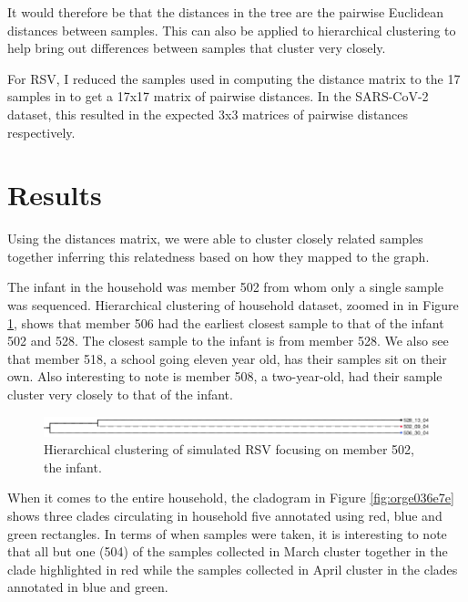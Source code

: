 \documentclass[10pt, a4paper]{article}
\begin{document}
It would therefore be that the distances in the tree are the pairwise Euclidean
distances between samples. This can also be applied to hierarchical clustering
to help bring out differences between samples that cluster very closely.

For RSV, I reduced the samples used in computing the distance matrix to the 17
samples in \cite{githinjiAssessingUtilityMinority2018} to get a 17x17 matrix of
pairwise distances.
In the SARS-CoV-2 dataset, this resulted in the expected 3x3 matrices of
pairwise distances respectively.

\clearpage

\clearpage
\section{Results}
\label{sec:org36f96dc}
Using the distances matrix, we were able to cluster closely related samples
together inferring this relatedness based on how they mapped to the graph. 

The infant in the household was member 502 from whom only a single sample was
sequenced. Hierarchical clustering of household dataset, zoomed in in
Figure \ref{fig:org06b024e}, shows that member 506 had the earliest closest sample
to that of the infant 502 and 528.
The closest sample to the infant is from member 528.
We also see that member 518, a school going eleven year old, has their samples
sit on their own.
Also interesting to note is member 508, a two-year-old, had their sample cluster
very closely to that of the infant.

\begin{figure}[h]
\centering
\includegraphics[width=1.0\textwidth]{../Figures/hh20-clado-infant.png}
\caption[A section of the cladogram of RSV focused on the infant]{\label{fig:org06b024e}Hierarchical clustering of simulated RSV focusing on member 502, the infant.}
\end{figure}


When it comes to the entire household, the cladogram in Figure \ref{fig:orge036e7e} shows three
clades circulating in household five annotated using red, blue and green rectangles.
In terms of when samples were taken, it is interesting to note that all but one
(504) of the samples collected in March cluster together in the clade
highlighted in red while the samples collected in April cluster in the clades
annotated in blue and green.
\end{document}
